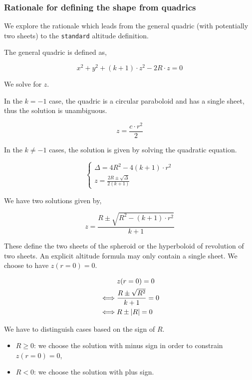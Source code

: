 \subsubsection{Rationale for defining the shape from quadrics}
We explore the rationale which leads from the general quadric (with potentially
two sheets) to the \lstinline{standard} altitude definition.

The general quadric is defined as,

\begin{equation}
x^2 + y^2 + (k+1) \cdot z^2 - 2 R \cdot z = 0
\end{equation}

We solve for $z$.

In the $k=-1$ case, the quadric is a circular paraboloid and has a single
sheet, thus the solution is unambiguous.

\begin{equation}
z = \frac{c \cdot r^2}{2}
\end{equation}

In the $k\neq-1$ cases, the solution is given by solving the quadratic equation.

\begin{equation} \begin{cases}
\Delta = 4 R^2 - 4 (k+1) \cdot r^2 \\
z = \frac{2R \pm \sqrt{\Delta}}{2(k+1)}
\end{cases} \end{equation}

We have two solutions given by,

\begin{equation}
z = \frac{R \pm \sqrt{R^2 - (k+1) \cdot r^2}}{k + 1}
\end{equation}

These define the two sheets of the spheroid or the hyperboloid of revolution of
two sheets. An explicit altitude formula may only contain a single sheet. We
choose to have $z(r=0) = 0$.

\begin{equation} \begin{split}
& z(r=0) = 0 \\
\iff & \frac{R \pm \sqrt{R^2}}{k+1} = 0 \\
\iff & R \pm \abs{R} = 0
\end{split} \end{equation}

We have to distinguish cases based on the sign of $R$.
\begin{itemize}
\item $R \geq 0$: we choose the solution with minus sign in order to constrain
                  $z(r=0)=0$,
\item $R < 0$: we choose the solution with plus sign.
\end{itemize}

